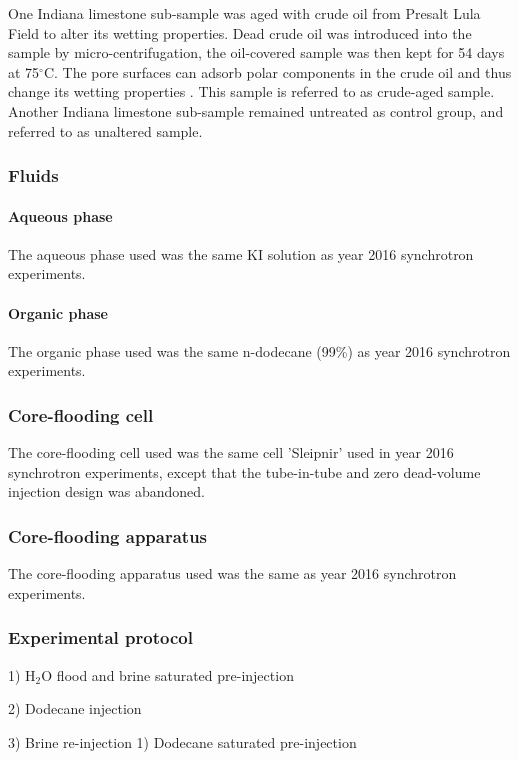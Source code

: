 One Indiana limestone sub-sample was aged with crude oil from Presalt Lula Field to alter its wetting properties. Dead crude oil was introduced into the sample by micro-centrifugation, the oil-covered sample was then kept for 54 days at 75$^{\circ}$C. The pore surfaces can adsorb polar components in the crude oil and thus change its wetting properties \citep{buckley1998mechanisms}. This sample is referred to as crude-aged sample. Another Indiana limestone sub-sample remained untreated as control group, and referred to as unaltered sample.
\subsubsection{Fluids}
\paragraph{Aqueous phase}
The aqueous phase used was the same KI solution as year 2016 synchrotron experiments.
\paragraph{Organic phase}
The organic phase used was the same n-dodecane (99\%) as year 2016 synchrotron experiments.
\subsubsection{Core-flooding cell}
The core-flooding cell used was the same cell 'Sleipnir' used in year 2016 synchrotron experiments, except that the tube-in-tube and zero dead-volume injection design was abandoned.

\subsubsection{Core-flooding apparatus}
The core-flooding apparatus used was the same as year 2016 synchrotron experiments.
\subsubsection{Experimental protocol}
1) H$_2$O flood and brine saturated pre-injection

2) Dodecane injection 

3) Brine re-injection
1) Dodecane saturated pre-injection

